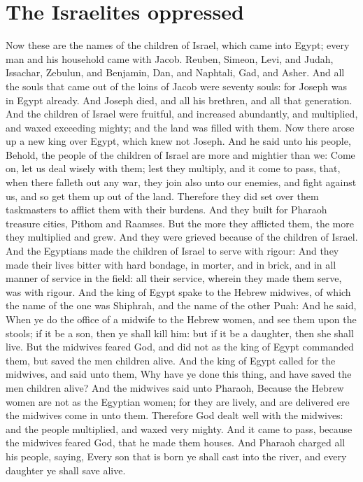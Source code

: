 
\section*{The Israelites oppressed}
\begin{biblechapter} %
\verse Now these are the names of the children of Israel, which came into Egypt; every man and his household came with Jacob.
\verse Reuben, Simeon, Levi, and Judah,
\verse Issachar, Zebulun, and Benjamin,
\verse Dan, and Naphtali, Gad, and Asher.
\verse And all the souls that came out of the loins of Jacob were seventy souls: for Joseph was in Egypt already.
\verse And Joseph died, and all his brethren, and all that generation.
\verse And the children of Israel were fruitful, and increased abundantly, and multiplied, and waxed exceeding mighty; and the land was filled with them.
\verse Now there arose up a new king over Egypt, which knew not Joseph.
\verse And he said unto his people, Behold, the people of the children of Israel are more and mightier than we:
\verse Come on, let us deal wisely with them; lest they multiply, and it come to pass, that, when there falleth out any war, they join also unto our enemies, and fight against us, and so get them up out of the land.
\verse Therefore they did set over them taskmasters to afflict them with their burdens. And they built for Pharaoh treasure cities, Pithom and Raamses.
\verse But the more they afflicted them, the more they multiplied and grew. And they were grieved because of the children of Israel.
\verse And the Egyptians made the children of Israel to serve with rigour:
\verse And they made their lives bitter with hard bondage, in morter, and in brick, and in all manner of service in the field: all their service, wherein they made them serve, was with rigour.
\verse And the king of Egypt spake to the Hebrew midwives, of which the name of the one was Shiphrah, and the name of the other Puah:
\verse And he said, When ye do the office of a midwife to the Hebrew women, and see them upon the stools; if it be a son, then ye shall kill him: but if it be a daughter, then she shall live.
\verse But the midwives feared God, and did not as the king of Egypt commanded them, but saved the men children alive.
\verse And the king of Egypt called for the midwives, and said unto them, Why have ye done this thing, and have saved the men children alive?
\verse And the midwives said unto Pharaoh, Because the Hebrew women are not as the Egyptian women; for they are lively, and are delivered ere the midwives come in unto them.
\verse Therefore God dealt well with the midwives: and the people multiplied, and waxed very mighty.
\verse And it came to pass, because the midwives feared God, that he made them houses.
\verse And Pharaoh charged all his people, saying, Every son that is born ye shall cast into the river, and every daughter ye shall save alive.
\end{biblechapter}

